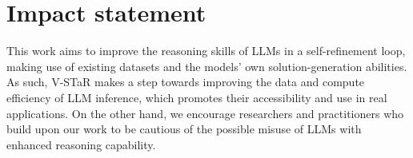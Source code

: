 \documentclass{article}
\theoremstyle{plain}
\theoremstyle{definition}
\theoremstyle{remark}
\begin{document}



\section*{Impact statement}

This work aims to improve the reasoning skills of LLMs in a self-refinement loop, making use of existing datasets and the models' own solution-generation abilities. As such, V-STaR makes a step towards improving the data and compute efficiency of LLM inference, which promotes their accessibility and use in real applications. On the other hand, we encourage researchers and practitioners who build upon our work to be cautious of the possible misuse of LLMs with enhanced reasoning capability.






\newpage
\appendix
\onecolumn


\end{document}
